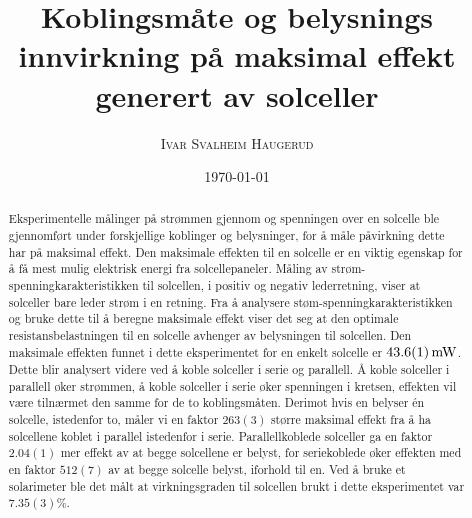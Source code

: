 \documentclass[%
 reprint,
 amsmath,amssymb,
 aps,
 norsk,
 booktabs
]{revtex4-1}
\begin{document}
\title{Koblingsmåte og belysnings innvirkning på maksimal effekt generert av solceller}
\author{\textsc{Ivar Svalheim Haugerud}}
\date{\today}

\begin{abstract}
Eksperimentelle målinger på strømmen gjennom og spenningen over en solcelle ble gjennomført under forskjellige koblinger og belysninger, for å måle påvirkning dette har på maksimal effekt. Den maksimale effekten til en solcelle er en viktig egenskap for å få mest mulig elektrisk energi fra solcellepaneler. Måling av strøm-spenningkarakteristikken til solcellen, i positiv og negativ lederretning, viser at solceller bare leder strøm i en retning. Fra å analysere støm-spenningkarakteristikken og bruke dette til å beregne maksimale effekt viser det seg at den optimale resistansbelastningen til en solcelle avhenger av belysningen til solcellen. Den maksimale effekten funnet i dette eksperimentet for en enkelt solcelle er $\SI{43.6\pm0.1}{\milli\watt}$. Dette blir analysert videre ved å koble solceller i serie og parallell. Å koble solceller i parallell øker strømmen, å koble solceller i serie øker spenningen i kretsen, effekten vil være tilnærmet den samme for de to koblingsmåten. Derimot hvis en belyser én solcelle, istedenfor to, måler vi en faktor $263(3)$ større maksimal effekt fra å ha solcellene koblet i parallel istedenfor i serie. Parallellkoblede solceller ga en faktor $2.04(1)$ mer effekt av at begge solcellene er belyst, for seriekoblede øker effekten med en faktor $512(7)$ av at begge solcelle belyst, iforhold til en. Ved å bruke et solarimeter ble det målt at virkningsgraden til solcellen brukt i dette eksperimentet var $7.35(3)\%$.
\end{abstract}

\maketitle

\end{document}
